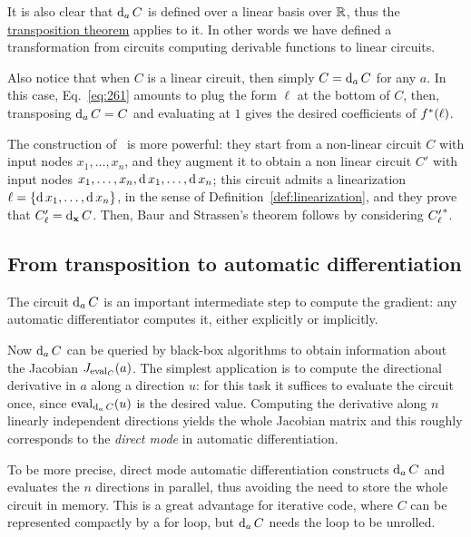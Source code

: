 It is also clear that $\operatorname{d}_aC$ is defined over a linear basis over
$\mathbb{R}$, thus the \hyperref[th:tellegen]{transposition theorem} applies
to it. In other words we have defined a transformation from circuits
computing derivable functions to linear circuits. 

Also notice that when $C$ is a linear circuit, then simply
$C=\operatorname{d}_aC$ for any $a$. In this case, Eq.~\eqref{eq:261} amounts to
plug the form $\ell$ at the bottom of $C$, then, transposing
$\operatorname{d}_aC=C$ and evaluating at $1$ gives the desired coefficients of
$f^\ast(\ell)$.


\begin{nota}
  The construction of~\cite{gashkov+gashkov05} is more powerful: they
  start from a non-linear circuit $C$ with input nodes
  $x_1,\ldots,x_n$, and they augment it to obtain a non linear circuit
  $C'$ with input nodes $x_1,\ldots,x_n,\operatorname{d} x_1,\ldots,\operatorname{d} x_n$;
  this circuit admits a linearization $\ell=\{\operatorname{d} x_1,\ldots,\operatorname{d}
  x_n\}$, in the sense of Definition~\ref{def:linearization}, and they
  prove that $C'_\ell=\operatorname{d}_{\mathbf{x}} C$. Then, Baur and Strassen's theorem
  follows by considering ${C'_\ell}^\ast$.
\end{nota}



\subsection{From transposition to automatic differentiation}
\label{sec:from-transp-autom}
The circuit $\operatorname{d}_a C$ is an important intermediate step to compute
the gradient: any automatic differentiator computes it, either
explicitly or implicitly.

Now $\operatorname{d}_aC$ can be queried by black-box algorithms to obtain
information about the Jacobian $J_{\operatorname{eval}_C}(a)$. The simplest
application is to compute the directional derivative in $a$ along a
direction $u$: for this task it suffices to evaluate the circuit once,
since $\operatorname{eval}_{\operatorname{d}_aC}(u)$ is the desired value. Computing the
derivative along $n$ linearly independent directions yields the whole
Jacobian matrix and this roughly corresponds to the
\emph{direct
  mode} in automatic differentiation.

\begin{remark}
  To be more precise, direct mode automatic differentiation constructs
  $\operatorname{d}_aC$ and evaluates the $n$ directions in parallel, thus
  avoiding the need to store the whole circuit in memory. This is a
  great advantage for iterative code, where $C$ can be represented
  compactly by a for loop, but $\operatorname{d}_a C$ needs the loop to be
  unrolled.
\end{remark}

